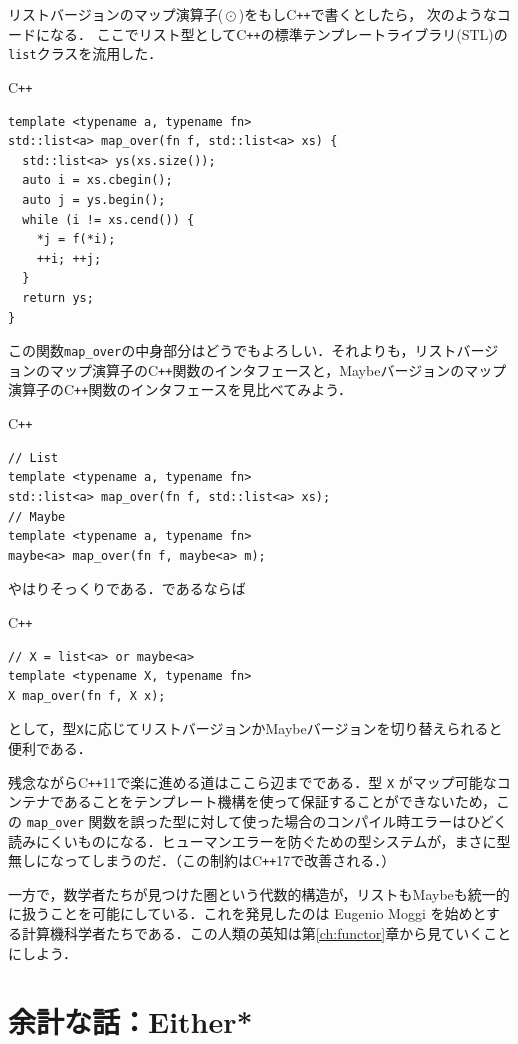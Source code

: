 \documentclass[a4paper]{jsbook}
\newcommand{\programminglanguage}[1]{\textsf{#1}}
\newcommand{\cxx}{\programminglanguage{C}\texttt{++}}
\newcommand{\cxxeleven}{\cxx\programminglanguage{11}}
\newcommand{\cxxseventeen}{\cxx\programminglanguage{17}}
\newcommand{\code}[1]{\texttt{#1}}
\newenvironment{cxxcode}{\begin{itembox}[r]{\cxx}}{\end{itembox}}
\DeclareMathOperator{\mMapList}{\odot}
\begin{document}
リストバージョンのマップ演算子($\mMapList$)をもし\cxx で書くとしたら，
次のようなコードになる．
ここでリスト型として\cxx の標準テンプレートライブラリ(STL)の
\code{list}クラスを流用した．
\begin{cxxcode}
\begin{verbatim}
template <typename a, typename fn>
std::list<a> map_over(fn f, std::list<a> xs) {
  std::list<a> ys(xs.size());
  auto i = xs.cbegin();
  auto j = ys.begin();
  while (i != xs.cend()) {
    *j = f(*i);
    ++i; ++j;
  }
  return ys;
}
\end{verbatim}
\end{cxxcode}
この関数\code{map\_over}の中身部分はどうでもよろしい．それよりも，リストバージョンのマップ演算子の\cxx 関数のインタフェースと，Maybeバージョンのマップ演算子の\cxx 関数のインタフェースを見比べてみよう．
\begin{cxxcode}
\begin{verbatim}
// List
template <typename a, typename fn>
std::list<a> map_over(fn f, std::list<a> xs);
// Maybe
template <typename a, typename fn>
maybe<a> map_over(fn f, maybe<a> m);
\end{verbatim}
\end{cxxcode}
やはりそっくりである．であるならば
\begin{cxxcode}
\begin{verbatim}
// X = list<a> or maybe<a>
template <typename X, typename fn>
X map_over(fn f, X x);
\end{verbatim}
\end{cxxcode}
として，型\code{X}に応じてリストバージョンかMaybeバージョンを切り替えられると便利である．

残念ながら\cxxeleven で楽に進める道はここら辺までである．型 \code{X} がマップ可能なコンテナであることをテンプレート機構を使って保証することができないため，この \code{map\_over} 関数を誤った型に対して使った場合のコンパイル時エラーはひどく読みにくいものになる．ヒューマンエラーを防ぐための型システムが，まさに型無しになってしまうのだ．（この制約は\cxxseventeen で改善される．）

一方で，数学者たちが見つけた圏という代数的構造が，リストもMaybeも統一的に扱うことを可能にしている．これを発見したのは Eugenio Moggi を始めとする計算機科学者たちである．この人類の英知は第\ref{ch:functor}章から見ていくことにしよう．


\section{余計な話：Either*}
\end{document}
